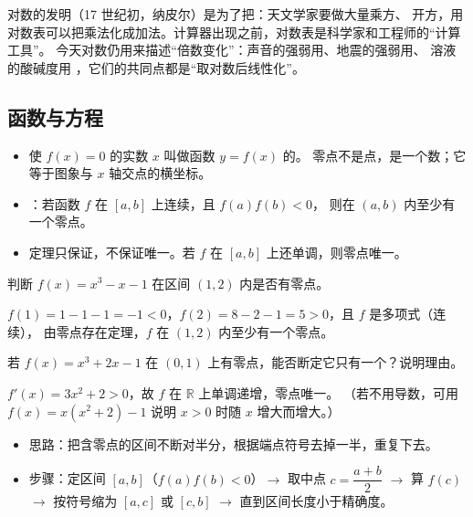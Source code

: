 \begin{explore}
对数的发明（17 世纪初，纳皮尔）是为了把：天文学家要做大量乘方、
开方，用对数表可以把乘法化成加法。计算器出现之前，对数表是科学家和工程师的“计算工具”。
今天对数仍用来描述“倍数变化”：声音的强弱用、地震的强弱用、
溶液的酸碱度用 ，它们的共同点都是“取对数后线性化”。

\subsection{函数与方程}

\begin{itemize}
  \item 使 $f(x)=0$ 的实数 $x$ 叫做函数 $y=f(x)$ 的。
        零点不是点，是一个数；它等于图象与 $x$ 轴交点的横坐标。
  \item {}：若函数 $f$ 在 $[a,b]$ 上连续，且 $f(a)f(b)<0$，
        则在 $(a,b)$ 内至少有一个零点。
  \item 定理只保证，不保证唯一。若 $f$ 在 $[a,b]$ 上还单调，则零点唯一。
\end{itemize}

\begin{example}
判断 $f(x)=x^3-x-1$ 在区间 $(1,2)$ 内是否有零点。
\end{example}
\begin{solution}
$f(1)=1-1-1=-1<0$，$f(2)=8-2-1=5>0$，且 $f$ 是多项式（连续），
由零点存在定理，$f$ 在 $(1,2)$ 内至少有一个零点。
\end{solution}

\begin{problem}
若 $f(x)=x^3+2x-1$ 在 $(0,1)$ 上有零点，能否断定它只有一个？说明理由。
\end{problem}
\begin{solution}
$f'(x)=3x^2+2>0$，故 $f$ 在 $\mathbb{R}$ 上单调递增，零点唯一。
（若不用导数，可用 $f(x)=x(x^2+2)-1$ 说明 $x>0$ 时随 $x$ 增大而增大。）
\end{solution}

\begin{itemize}
  \item 思路：把含零点的区间不断对半分，根据端点符号去掉一半，重复下去。
  \item 步骤：定区间 $[a,b]$（$f(a)f(b)<0$）$\to$ 取中点 $c=\dfrac{a+b}{2}$
        $\to$ 算 $f(c)$ $\to$ 按符号缩为 $[a,c]$ 或 $[c,b]$ $\to$ 直到区间长度小于精确度。
\end{itemize}


\end{explore}
